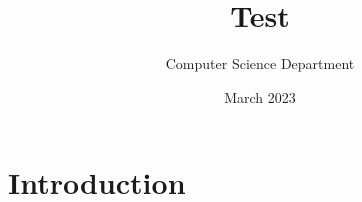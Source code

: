 \documentclass{article}
\title{Test}
\author{Computer Science Department}
\date{March 2023}
\begin{document}
\maketitle

\section{Introduction}
\end{document}
